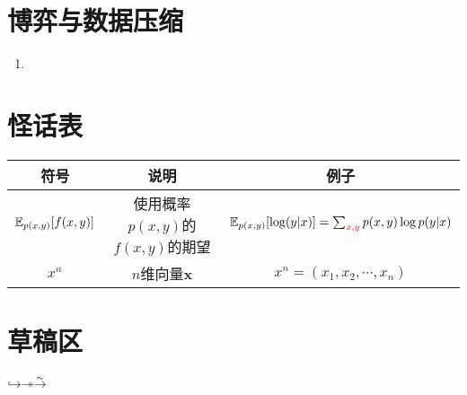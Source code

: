 \documentclass{article}
\begin{document}
\section{博弈与数据压缩}
\begin{enumerate}[label=(\arabic*)]
	\item 
\end{enumerate}

\section{怪话表}
\begin{table}[H]
	\centering
	\renewcommand\arraystretch{1.8}
	\begin{tabular}{ccc}\hline
		符号 & 说明 & 例子\\
		\hline
		$\mathbb{E}_{p(x,y)}[f(x,y)]$ & 使用概率$p(x,y)$的$f(x,y)$的期望 & $\mathbb{E}_{p(x,y)}[\log (y|x)]=\sum_{\color{red} x,y}p(x,y)\log p(y|x)$\\ \hline
		$x^n$ & $n$维向量$\bm{x}$ & $x^n = (x_1,x_2,\cdots ,x_n)$ \\ \hline
	\end{tabular}
\end{table}

\section{草稿区}
$\hookrightarrow \twoheadrightarrow \stackrel{\sim}{\rightarrow}$
\end{document}
